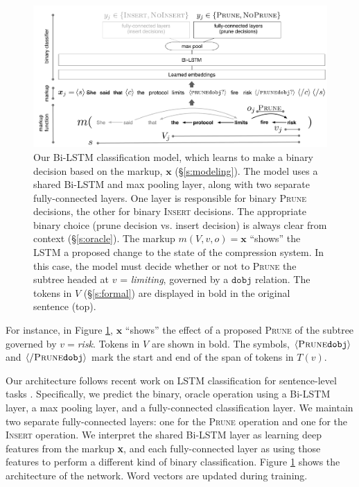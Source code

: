\documentclass[11pt,a4paper]{article}
\begin{document}
\begin{figure}[htb!]
\centering
\includegraphics[width=.75\textwidth]{example.pdf}
\caption{Our Bi-LSTM classification model, which learns to make a binary decision based on the markup, $\bm{x}$ (\S\ref{s:modeling}). The model uses a shared Bi-LSTM and max pooling layer, along with two separate fully-connected layers. One layer is responsible for binary \textsc{Prune} decisions, the other for binary \textsc{Insert} decisions. The appropriate binary choice (prune decision vs. insert decision) is always clear from context (\S\ref{s:oracle}). The markup $m(V,v,o)=\bm{x}$ ``shows'' the LSTM a proposed change to the state of the compression system.  In this case, the model must decide whether or not to \textsc{Prune} the subtree headed at $v$ = \textit{limiting}, governed by a $\texttt{dobj}$ relation. The tokens in $V$ (\S\ref{s:formal}) are displayed in bold in the original sentence (top).}
\label{f:example}
\end{figure}

For instance, in Figure \ref{f:example}, $\bm{x}$ ``shows'' the  effect of a proposed \textsc{Prune} of the subtree governed by $v=$\textit{risk}. Tokens in $V$ are shown in bold. The symbols, $\langle \textsc{Prune} \texttt{dobj} \rangle$  and $\langle / \textsc{Prune} \texttt{dobj} \rangle$ mark the start and end of the span of tokens in $T(v)$.

Our architecture follows recent work on LSTM classification for sentence-level tasks \cite{D17-1070}. Specifically, we predict the binary, oracle operation using a Bi-LSTM layer, a max pooling layer, and a fully-connected classification layer. We maintain two separate fully-connected layers: one for the \textsc{Prune} operation and one for the \textsc{Insert} operation. We interpret the shared Bi-LSTM layer as learning deep features from the markup \textbf{x}, and each fully-connected layer as using those features to perform a different kind of binary classification. Figure \ref{f:example} shows the architecture of the network. Word vectors are updated during training.
\end{document}
